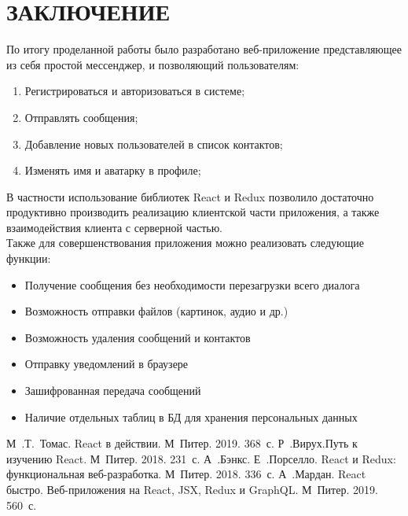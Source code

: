 \documentclass[14pt,final]{report}
\begin{document}
\chapter*{ЗАКЛЮЧЕНИЕ}
По итогу проделанной работы было разработано веб-приложение представляющее из себя
простой мессенджер, и позволяющий пользователям:
\begin{enumerate}
    \item Регистрироваться и авторизоваться в системе;
    \item Отправлять сообщения;
    \item Добавление новых пользователей в список контактов;
    \item Изменять имя и аватарку в профиле;
\end{enumerate}
В частности использование библиотек React и Redux позволило достаточно продуктивно производить реализацию клиентской части приложения, а также взаимодействия клиента с серверной частью.\\
Также для совершенствования приложения можно реализовать следующие функции:
\begin{itemize}
    \item Получение сообщения без необходимости перезагрузки всего диалога
    \item Возможность отправки файлов (картинок, аудио и др.)
    \item Возможность удаления сообщений и контактов
    \item Отправку уведомлений в браузере
    \item Зашифрованная передача сообщений
    \item Наличие отдельных таблиц в БД для хранения персональных данных
\end{itemize}




\begin{thebibliography}{99}
 М~.Т.~Томас. React в действии. М\;~Питер. 2019. 368~с.
 Р~.Вирух.Путь к изучению React. М\;~Питер. 2018. 231~с.
 А~.Бэнкс. Е~.Порселло. React и Redux: функциональная веб-разработка. М\;~Питер. 2018. 336~с.
 А~.Мардан. React быстро. Веб-приложения на React, JSX, Redux и GraphQL. М\;~Питер. 2019. 560~с.
\end{thebibliography}

\appendices
\end{document}
